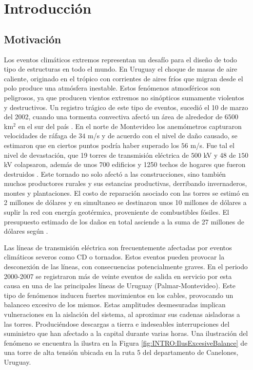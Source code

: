 \chapter{Introducción}\label{Cap:Introduccion}
 
\section{Motivación}
\linenumbers
Los eventos climáticos extremos representan un desafío para el diseño de todo tipo de estructuras en todo el mundo. En Uruguay el choque de masas de aire caliente, originado en el trópico con corrientes de aires fríos que migran desde el polo produce una atmósfera inestable. Estos fenómenos atmosféricos son peligrosos, ya que producen vientos extremos no sinópticos sumamente violentos y destructivos. Un registro trágico de este tipo de eventos, sucedió el 10 de marzo del 2002, cuando una tormenta convectiva afectó un área de alrededor de $6500$ km$^2$ en el sur del país \cite{tormenta2002}. En el norte de Montevideo los anemómetros capturaron velocidades de ráfaga de $34$ m/s y de acuerdo con el nivel de daño causado, se estimaron que en ciertos puntos podría haber superado los $56$ m/s. Fue tal el nivel de devastación, que 19 torres de transmisión eléctrica de $500$ kV y 48 de $150$ kV colapsaron, además de unos 700 edificios y 1250 techos de hogares que fueron destruidos \citep{duranona2015significance}. Este tornado no solo afectó a las construcciones, sino también muchos productores rurales y sus estancias productivas, derribando invernaderos, montes y plantaciones. El costo de reparación asociado con las torres se estimó en 2 millones de dólares y en simultaneo se destinaron unos 10 millones de dólares a suplir la red con energía geotérmica, proveniente de combustibles fósiles. El presupuesto estimado de los daños en total asciende a la suma de 27 millones de dólares según \cite{duranona2019first}. 

Las líneas de transmisión eléctrica son frecuentemente afectadas por eventos climáticos severos como \gls{CD} o tornados. Estos eventos pueden provocar la desconexión de las líneas, con consecuencias potencialmente graves. En el periodo 2000-2007 se registraron más de veinte eventos de salida en servicio por esta causa en una de las principales líneas de Uruguay (Palmar-Montevideo). Este tipo de fenómenos inducen fuertes movimientos en los cables, provocando un balanceo excesivo de los mismos. Estas amplitudes desmesuradas implican vulneraciones en la aislación del sistema, al aproximar sus cadenas aisladoras a las torres. Produciéndose descargas a tierra e indeseables interrupciones del suministro que han afectado a la capital durante varias horas. Una ilustración del fenómeno se encuentra la ilustra en la Figura \ref{fig:INTRO:IlusExcesiveBalance} de una torre de alta tensión ubicada en la ruta 5 del departamento de Canelones, Uruguay. 


